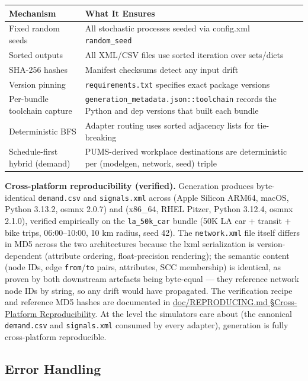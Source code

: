\begin{longtable}[]{@{}ll@{}}
\toprule\noalign{}
Mechanism & What It Ensures \\
\midrule\noalign{}
\endhead
\bottomrule\noalign{}
\endlastfoot
Fixed random seeds & All stochastic processes seeded via config.xml
\texttt{random\_seed} \\
Sorted outputs & All XML/CSV files use sorted iteration over
sets/dicts \\
SHA-256 hashes & Manifest checksums detect any input drift \\
Version pinning & \texttt{requirements.txt} specifies exact package
versions \\
Per-bundle toolchain capture &
\texttt{generation\_metadata.json::toolchain} records the Python and dep
versions that built each bundle \\
Deterministic BFS & Adapter routing uses sorted adjacency lists for
tie-breaking \\
Schedule-first hybrid (demand) & PUMS-derived workplace destinations are
deterministic per (modelgen, network, seed) triple \\
\end{longtable}

\textbf{Cross-platform reproducibility (verified).} Generation produces
byte-identical \texttt{demand.csv} and \texttt{signals.xml} across
(Apple Silicon ARM64, macOS, Python 3.13.2, osmnx 2.0.7) and (x86\_64,
RHEL Pitzer, Python 3.12.4, osmnx 2.1.0), verified empirically on the
\texttt{la\_50k\_car} bundle (50K LA car + transit + bike trips,
06:00--10:00, 10 km radius, seed 42). The \texttt{network.xml} file
itself differs in MD5 across the two architectures because the lxml
serialization is version-dependent (attribute ordering, float-precision
rendering); the semantic content (node IDs, edge
\texttt{from}/\texttt{to} pairs, attributes, SCC membership) is
identical, as proven by both downstream artefacts being byte-equal ---
they reference network node IDs by string, so any drift would have
propagated. The verification recipe and reference MD5 hashes are
documented in
\href{../REPRODUCING.md\#cross-platform-reproducibility-verified}{doc/REPRODUCING.md
§Cross-Platform Reproducibility}. At the level the simulators care about
(the canonical \texttt{demand.csv} and \texttt{signals.xml} consumed by
every adapter), generation is fully cross-platform reproducible.

\subsection{Error Handling}\label{373-error-handling}

